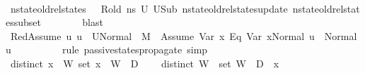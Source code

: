 \begin{isabellebody}
\ \ \ \ \isamarkupfalse%
\ {\isacartoucheopen}nstate{\isacharunderscore}{\kern0pt}old{\isacharunderscore}{\kern0pt}rel{\isacharunderscore}{\kern0pt}states\ {\isasymLambda}\ {\isasymLambda}{\isacharprime}{\kern0pt}\ R{\isacharunderscore}{\kern0pt}old\ ns\ U{}{\isacartoucheclose}\ U{}Sub\ nstate{\isacharunderscore}{\kern0pt}old{\isacharunderscore}{\kern0pt}rel{\isacharunderscore}{\kern0pt}states{\isacharunderscore}{\kern0pt}update\ nstate{\isacharunderscore}{\kern0pt}old{\isacharunderscore}{\kern0pt}rel{\isacharunderscore}{\kern0pt}states{\isacharunderscore}{\kern0pt}subset\isanewline
\ \ \ \ \ \ \isamarkupfalse%
\ blast\isanewline
\ \ \isamarkupfalse%
\ RedAssume{\isacharcolon}{\kern0pt}\ {\isachardoublequoteopen}{\isasymAnd}u{\isachardot}{\kern0pt}\ u\ {\isasymin}\ {\isacharquery}{\kern0pt}U{}Normal\ {\isasymLongrightarrow}\ M{\isacharcomma}{\kern0pt}{\isasymLambda}{\isacharprime}{\kern0pt}{\isacharcomma}{\kern0pt}{\isasymGamma}{\isacharcomma}{\kern0pt}{\isasymOmega}\ {\isasymturnstile}\ {\isasymlangle}Assume\ {\isacharparenleft}{\kern0pt}{\isacharparenleft}{\kern0pt}Var\ x{}{\isacharparenright}{\kern0pt}\ {\isasymguillemotleft}Eq{\isasymguillemotright}\ {\isacharparenleft}{\kern0pt}Var\ x{}{\isacharparenright}{\kern0pt}{\isacharparenright}{\kern0pt}{\isacharcomma}{\kern0pt}Normal\ u{\isasymrangle}\ {\isasymrightarrow}\ Normal\ u{\isachardoublequoteclose}\ \ \ \ \isanewline
\ \ \ \ \isamarkupfalse%
\ {\isacharparenleft}{\kern0pt}rule\ passive{\isacharunderscore}{\kern0pt}states{\isacharunderscore}{\kern0pt}propagate{\isacharunderscore}{\kern0pt}{}{\isacharparenright}{\kern0pt}\ simp\isanewline
\ \ \isamarkupfalse%
\ {\isacartoucheopen}distinct\ {\isacharparenleft}{\kern0pt}x{}\ {\isacharhash}{\kern0pt}\ W{\isacharparenright}{\kern0pt}{\isacartoucheclose}\ {\isacartoucheopen}set\ {\isacharparenleft}{\kern0pt}x{}\ {\isacharhash}{\kern0pt}\ W{\isacharparenright}{\kern0pt}\ {\isasyminter}\ D{}\ {\isacharequal}{\kern0pt}\ {\isacharbraceleft}{\kern0pt}{\isacharbraceright}{\kern0pt}{\isacartoucheclose}\ \isamarkupfalse%
\ {\isachardoublequoteopen}distinct\ W{\isachardoublequoteclose}\ \ {\isachardoublequoteopen}set\ W\ {\isasyminter}\ {\isacharparenleft}{\kern0pt}D{}\ {\isasymunion}\ {\isacharbraceleft}{\kern0pt}x{}{\isacharbraceright}{\kern0pt}{\isacharparenright}{\kern0pt}\ {\isacharequal}{\kern0pt}\ {\isacharbraceleft}{\kern0pt}{\isacharbraceright}{\kern0pt}{\isachardoublequoteclose}\ \isamarkupfalse%

\end{isabellebody}
